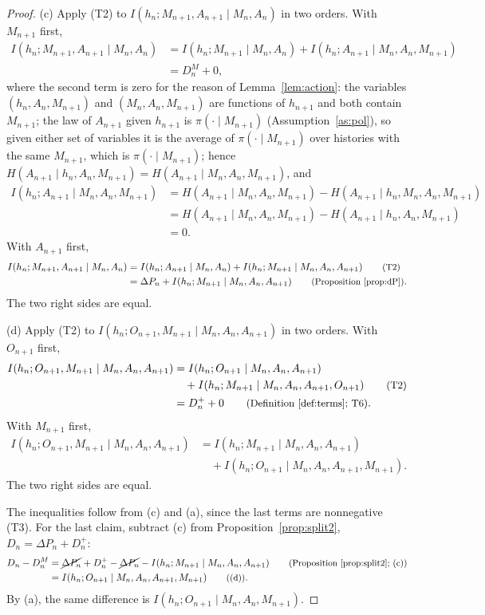 \documentclass{article}
\theoremstyle{definition}
\theoremstyle{remark}
\newcommand{\dP}{\Delta P}
\newcommand{\why}[1]{\tag*{\small(#1)}}
\begin{document}
\begin{proof}
(c) Apply (T2) to $I(h_n;M_{n+1},A_{n+1}\mid M_n,A_n)$ in two orders. With $M_{n+1}$ first,
\begin{align*}
I(h_n;M_{n+1},A_{n+1}\mid M_n,A_n)&=I(h_n;M_{n+1}\mid M_n,A_n)+I(h_n;A_{n+1}\mid M_n,A_n,M_{n+1}) \why{T2}\\
&=D^M_n+0,
\end{align*}
where the second term is zero for the reason of Lemma~\ref{lem:action}: the variables $(h_n,A_n,M_{n+1})$ and $(M_n,A_n,M_{n+1})$ are functions of $h_{n+1}$ and both contain $M_{n+1}$; the law of $A_{n+1}$ given $h_{n+1}$ is $\pi(\cdot\mid M_{n+1})$ (Assumption~\ref{as:pol}), so given either set of variables it is the average of $\pi(\cdot\mid M_{n+1})$ over histories with the same $M_{n+1}$, which is $\pi(\cdot\mid M_{n+1})$; hence $H(A_{n+1}\mid h_n,A_n,M_{n+1})=H(A_{n+1}\mid M_n,A_n,M_{n+1})$, and
\begin{align*}
I(h_n;A_{n+1}\mid M_n,A_n,M_{n+1})&=H(A_{n+1}\mid M_n,A_n,M_{n+1})-H(A_{n+1}\mid h_n,M_n,A_n,M_{n+1}) \why{T1}\\
&=H(A_{n+1}\mid M_n,A_n,M_{n+1})-H(A_{n+1}\mid h_n,A_n,M_{n+1}) \why{T4}\\
&=0.
\end{align*}
With $A_{n+1}$ first,
\begin{align*}
I(h_n;M_{n+1},A_{n+1}\mid M_n,A_n)&=I(h_n;A_{n+1}\mid M_n,A_n)+I(h_n;M_{n+1}\mid M_n,A_n,A_{n+1}) \why{T2}\\
&=\dP_n+I(h_n;M_{n+1}\mid M_n,A_n,A_{n+1}) \why{Proposition~\ref{prop:dP}}.
\end{align*}
The two right sides are equal.

(d) Apply (T2) to $I(h_n;O_{n+1},M_{n+1}\mid M_n,A_n,A_{n+1})$ in two orders. With $O_{n+1}$ first,
\begin{align*}
I(h_n;O_{n+1},M_{n+1}\mid M_n,A_n,A_{n+1})&=I(h_n;O_{n+1}\mid M_n,A_n,A_{n+1})\\
&\quad+I(h_n;M_{n+1}\mid M_n,A_n,A_{n+1},O_{n+1}) \why{T2}\\
&=D^+_n+0 \why{Definition~\ref{def:terms}; T6}.
\end{align*}
With $M_{n+1}$ first,
\begin{align*}
I(h_n;O_{n+1},M_{n+1}\mid M_n,A_n,A_{n+1})&=I(h_n;M_{n+1}\mid M_n,A_n,A_{n+1})\\
&\quad+I(h_n;O_{n+1}\mid M_n,A_n,A_{n+1},M_{n+1}) \why{T2}.
\end{align*}
The two right sides are equal.

The inequalities follow from (c) and (a), since the last terms are nonnegative (T3). For the last claim, subtract (c) from Proposition~\ref{prop:split2}, $D_n=\dP_n+D^+_n$:
\begin{align*}
D_n-D^M_n&=\cancel{\dP_n}+D^+_n-\cancel{\dP_n}-I(h_n;M_{n+1}\mid M_n,A_n,A_{n+1}) \why{Proposition~\ref{prop:split2}; (c)}\\
&=I(h_n;O_{n+1}\mid M_n,A_n,A_{n+1},M_{n+1}) \why{(d)}.
\end{align*}
By (a), the same difference is $I(h_n;O_{n+1}\mid M_n,A_n,M_{n+1})$.
\end{proof}
\end{document}
